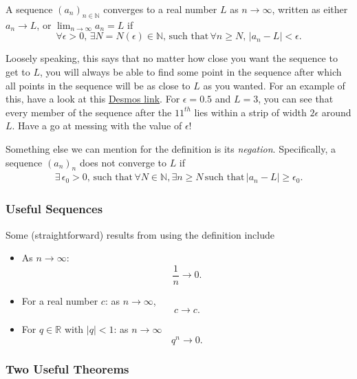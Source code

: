 \documentclass[
  17pt,
  a4paper]{extarticle}
\providecommand{\tightlist}{%
  \setlength{\itemsep}{0pt}\setlength{\parskip}{0pt}}
\theoremstyle{plain}
\theoremstyle{definition}
\theoremstyle{plain}
\theoremstyle{plain}
\theoremstyle{plain}
\theoremstyle{plain}
\theoremstyle{definition}
\theoremstyle{definition}
\theoremstyle{remark}
\theoremstyle{remark}
\let\BeginKnitrBlock\begin \let\EndKnitrBlock\end
\renewcommand{\;}{\,}
\begin{document}
\BeginKnitrBlock{definition}[Sequence Convergence]
{\label{def:def2} }A sequence \((a_n)_{n\in\mathbb{N}}\) converges to a real number \(L\) as \(n \longrightarrow \infty\), written as either \(a_n \longrightarrow L\), or \(\lim_{n \to \infty}a_n = L\) if \[\forall \epsilon > 0, \; \exists N = N(\epsilon) \in \mathbb{N}, \; \text{such that} \; \forall n \geq N, \; \lvert a_n - L \rvert < \epsilon.\]
\EndKnitrBlock{definition}
Loosely speaking, this says that no matter how close you want the sequence to get to \(L\), you will always be able to find some point in the sequence after which all points in the sequence will be as close to \(L\) as you wanted. For an example of this, have a look at this \href{https://www.desmos.com/calculator/dfkjgg0wzj}{Desmos link}. For \(\epsilon = 0.5\) and \(L = 3\), you can see that every member of the sequence after the \(11^{th}\) lies within a strip of width \(2\epsilon\) around \(L\). Have a go at messing with the value of \(\epsilon\)!

Something else we can mention for the definition is its \emph{negation}. Specifically, a sequence \((a_n)_n\) does not converge to \(L\) if
\begin{align*}
    \exists\; \epsilon_0 > 0, \; \text{such that} \; \forall N \in \mathbb{N}, \exists n \geq N \; \text{such that} \; \lvert a_n - L \rvert \geq \epsilon_0.
\end{align*}

\hypertarget{useful-sequences}{%
\subsubsection{Useful Sequences}\label{useful-sequences}}

Some (straightforward) results from using the definition include

\begin{itemize}
\tightlist
\item
  As \(n \longrightarrow \infty\): \[\frac{1}{n} \longrightarrow 0.\]
\item
  For a real number \(c\): as \(n \longrightarrow \infty\), \[c \longrightarrow c.\]
\item
  For \(q \in \mathbb{R}\) with \(\lvert q \rvert < 1\): as \(n \longrightarrow \infty\) \[q^n \longrightarrow 0.\]
\end{itemize}

\hypertarget{two-useful-theorems}{%
\subsubsection{Two Useful Theorems}\label{two-useful-theorems}}
\end{document}
